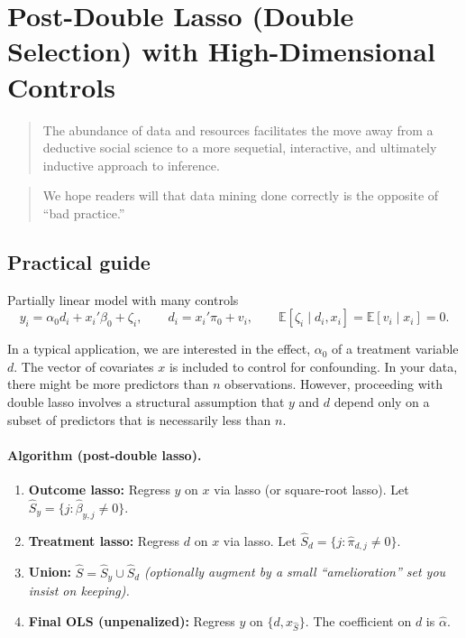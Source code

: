\section{Post-Double Lasso (Double Selection) with High-Dimensional Controls}


\begin{quotation}
\noindent The abundance of data and resources facilitates the move away from a deductive social science to a more sequetial, interactive, and ultimately inductive approach to inference.
\\ \cite{grimmer2021machine}
\end{quotation}


\begin{quotation}
\noindent We hope readers will that data mining done correctly is the opposite of ``bad practice.'' \\  \cite{belloni2014high} 
\end{quotation}

\subsection*{Practical guide}

Partially linear model with many controls
\[
y_i=\alpha_0 d_i + x_i'\beta_0 + \zeta_i,\qquad
d_i=x_i'\pi_0+v_i,\qquad \mathbb{E}[\zeta_i\mid d_i,x_i]=\mathbb{E}[v_i\mid x_i]=0.
\]

In a typical application, we are interested in the effect, $\alpha_0$ of a treatment variable $d$. The vector of covariates $x$ is included to control for confounding. 
In your data, there might be more predictors than $n$ observations. However, proceeding with double lasso involves a structural assumption that $y$ and $d$ depend only on a subset of predictors that is necessarily less than $n$.

\paragraph{Algorithm (post-double lasso).}
\begin{enumerate}
\item \textbf{Outcome lasso:} Regress $y$ on $x$ via lasso (or square-root lasso). Let $\widehat S_y=\{j:\widehat\beta_{y,j}\neq 0\}$.
\item \textbf{Treatment lasso:} Regress $d$ on $x$ via lasso. Let $\widehat S_d=\{j:\widehat\pi_{d,j}\neq 0\}$.
\item \textbf{Union:} $\widehat S=\widehat S_y\cup \widehat S_d$ \emph{(optionally augment by a small ``amelioration'' set you insist on keeping).}
\item \textbf{Final OLS (unpenalized):} Regress $y$ on $\{d, x_{\widehat S}\}$. The coefficient on $d$ is $\widehat\alpha$.
\end{enumerate}

